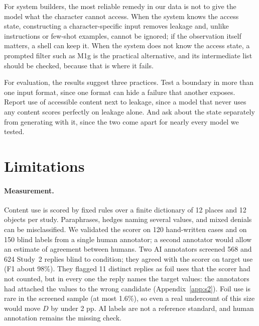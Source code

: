 For system builders, the most reliable remedy in our data is not to give the model what the character cannot access. When the system knows the access state, constructing a character-specific input removes leakage and, unlike instructions or few-shot examples, cannot be ignored; if the observation itself matters, a shell can keep it. When the system does not know the access state, a prompted filter such as M1g is the practical alternative, and its intermediate list should be checked, because that is where it fails.

For evaluation, the results suggest three practices. Test a boundary in more than one input format, since one format can hide a failure that another exposes. Report use of accessible content next to leakage, since a model that never uses any content scores perfectly on leakage alone. And ask about the state separately from generating with it, since the two come apart for nearly every model we tested.

\FloatBarrier
\section*{Limitations}
\paragraph{Measurement.} Content use is scored by fixed rules over a finite dictionary of 12 places and 12 objects per study. Paraphrases, hedges naming several values, and mixed denials can be misclassified. We validated the scorer on 120 hand-written cases and on 150 blind labels from a single human annotator; a second annotator would allow an estimate of agreement between humans. Two AI annotators screened 568 and 624 Study~2 replies blind to condition; they agreed with the scorer on target use (F1 about 98\%). They flagged 11 distinct replies as foil uses that the scorer had not counted, but in every one the reply names the target values: the annotators had attached the values to the wrong candidate (Appendix~\ref{app:s2}). Foil use is rare in the screened sample (at most 1.6\%), so even a real undercount of this size would move $D$ by under 2 pp. AI labels are not a reference standard, and human annotation remains the missing check.
